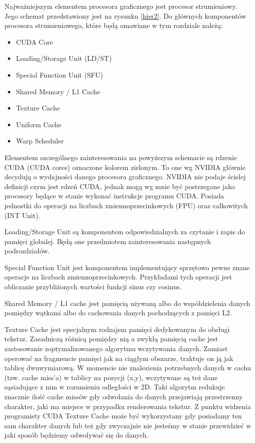 Najważniejszym elementem procesora graficznego jest procesor strumieniowy.
Jego schemat przedstawiony jest na rysunku \ref{hier2}. Do głównych komponentów
procesora strumieniowego, które będą omawiane w tym rozdziale należą:

\begin{itemize}
\item CUDA Core
\item Loading/Storage Unit (LD/ST)
\item Special Function Unit (SFU)
\item Shared Memory / L1 Cache
\item Texture Cache
\item Uniform Cache
\item Warp Scheduler
\end{itemize}

Elementem szczególnego  zainteresowania na powyższym schemacie są rdzenie CUDA
(CUDA cores) oznaczone kolorem zielonym. To one wg NVIDIA głównie decydują o
wydajności danego procesora graficznego. NVIDIA nie podaje ścisłej definicji
czym jest rdzeń CUDA, jednak mogą wg mnie być postrzegane jako procesory będące w
stanie wykonać instrukcje programu CUDA. Posiada jednostki do operacji
na liczbach zmiennoprzecinkowych (FPU) oraz całkowitych (INT Unit).

Loading/Storage Unit są komponentem odpowiedzialnych za czytanie i zapis do
pamięci globalej. Będą one przedmiotem zainteresowania następnych podrozdziałów.

Special Function Unit jest komponentem implementujący sprzętowo pewne znane
operacje na liczbach zmiennoprzecinkowych. Przykładami tych operacji jest
obliczanie przybliżonych wartości funkcji sinus czy cosinus.

Shared Memory / L1 cache jest pamięcią używaną albo do współdzielenia danych
pomiędzy wątkami albo do cachowania danych pochodzących z pamięci L2.

Texture Cache jest specjalnym rodzajem pamięci dedykowanym do obsługi tekstur.
Zasadniczą różnicą pomiędzy nią a zwykłą pamięcią cache jest zastosowanie
zoptymalizowanego algorytmu wczytywania danych. Zamiast operować na fragmencie
pamięci jak na ciągłym obszarze, traktuje on ją jak tablicę dwuwymiarową. W
momencie nie znalezienia potrzebnych danych w cachu (tzw. cache miss'a) w
tablicy na pozycji (x,y), wczytywane są też dane sąsiadujące z nim w rozumieniu
odległości w 2D. Taki algorytm redukuje znacznie ilość cache missów gdy
odwołania do danych przejawiają przestrzenny charakter, jaki ma miejsce w
przypadku renderowania tekstur. Z punktu widzenia programisty CUDA Texture Cache może być
wykorzystany gdy posiadamy ten sam charakter danych lub też gdy zwyczajnie nie
jesteśmy w stanie przewidzieć w jaki sposób będziemy odwoływać się do danych.

